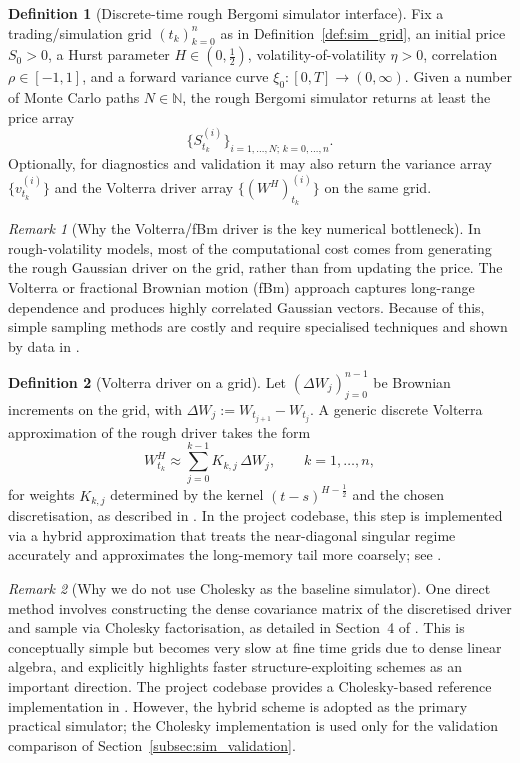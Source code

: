 \documentclass[12pt,a4paper]{article}
\theoremstyle{definition}
\newtheorem{definition}{Definition}[section]
\theoremstyle{plain}
\theoremstyle{remark}
\newtheorem{remark}{Remark}[section]
\theoremstyle{plain}
\begin{document}
\begin{definition}[Discrete-time rough Bergomi simulator interface]
\label{def:rb_sim_interface}
Fix a trading/simulation grid $(t_k)_{k=0}^n$ as in Definition~\ref{def:sim_grid}, an initial price $S_0>0$, a Hurst parameter $H\in(0,\tfrac12)$, volatility-of-volatility $\eta>0$, correlation $\rho\in[-1,1]$, and a forward variance curve $\xi_0:[0,T]\to(0,\infty)$.
Given a number of Monte Carlo paths $N\in\mathbb{N}$, the rough Bergomi simulator returns at least the price array
\[
\bigl\{S^{(i)}_{t_k}\bigr\}_{i=1,\dots,N;\,k=0,\dots,n}.
\]
Optionally, for diagnostics and validation it may also return the variance array $\{v^{(i)}_{t_k}\}$ and the Volterra driver array $\{(W^{H})^{(i)}_{t_k}\}$ on the same grid.
\end{definition}

\begin{remark}[Why the Volterra/fBm driver is the key numerical bottleneck]
\label{rem:rb_driver_bottleneck}
In rough-volatility models, most of the computational cost comes from generating the rough Gaussian driver on the grid, rather than from updating the price.
The Volterra or fractional Brownian motion (fBm) approach captures long-range dependence and produces highly correlated Gaussian vectors. Because of this, simple sampling methods are costly and require specialised techniques \cite{BayerFriz2016} and shown by data in \cite{GatheralRough}.
\end{remark}

\begin{definition}[Volterra driver on a grid]
\label{def:rb_volterra_grid}
Let $(\Delta W_j)_{j=0}^{n-1}$ be Brownian increments on the grid, with $\Delta W_j:=W_{t_{j+1}}-W_{t_j}$.
A generic discrete Volterra approximation of the rough driver takes the form
\[
W^H_{t_k}\approx \sum_{j=0}^{k-1} K_{k,j}\,\Delta W_j,
\qquad k=1,\dots,n,
\]
for weights $K_{k,j}$ determined by the kernel $(t-s)^{H-\frac12}$ and the chosen discretisation, as described in \cite{BayerFriz2016}.
In the project codebase, this step is implemented via a hybrid approximation that treats the near-diagonal singular regime accurately and approximates the long-memory tail more coarsely; see .
\end{definition}

\begin{remark}[Why we do not use Cholesky as the baseline simulator]
\label{rem:rb_no_cholesky}
One direct method involves constructing the dense covariance matrix of the discretised driver and sample via Cholesky factorisation, as detailed in Section~4 of \cite{BayerFriz2016}.
This is conceptually simple but becomes very slow at fine time grids due to dense linear algebra, and \cite{BayerFriz2016} explicitly highlights faster structure-exploiting schemes as an important direction.
The project codebase provides a Cholesky-based reference implementation in . However, the hybrid scheme is adopted as the primary practical simulator; the Cholesky implementation is used only for the validation comparison of Section~\ref{subsec:sim_validation}.
\end{remark}
\end{document}
